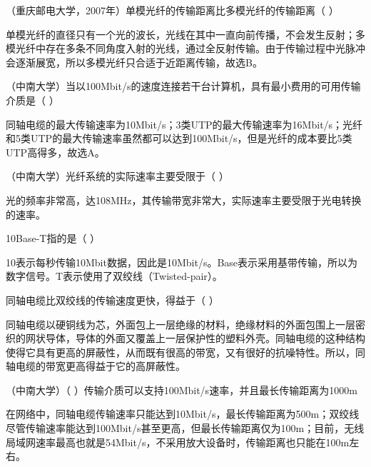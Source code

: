 \question （重庆邮电大学，2007年）单模光纤的传输距离比多模光纤的传输距离（ ）
\par{}
\begin{solution}单模光纤的直径只有一个光的波长，光线在其中一直向前传播，不会发生反射；多模光纤中存在多条不同角度入射的光线，通过全反射传输。由于传输过程中光脉冲会逐渐展宽，所以多模光纤只合适于近距离传输，故选B。
\end{solution}
\question （中南大学）当以100Mbit/s的速度连接若干台计算机，具有最小费用的可用传输介质是（
）
\par{}
\begin{solution}同轴电缆的最大传输速率为10Mbit/s；3类UTP的最大传输速率为16Mbit/s；光纤和5类UTP的最大传输速率虽然都可以达到100Mbit/s，但是光纤的成本要比5类UTP高得多，故选A。
\end{solution}
\question （中南大学）光纤系统的实际速率主要受限于（ ）
\par{}
\begin{solution}光的频率非常高，达108MHz，其传输带宽非常大，实际速率主要受限于光电转换的速率。
\end{solution}
\question 10Base-T指的是（ ）
\par{}
\begin{solution}10表示每秒传输10Mbit数据，因此是10Mbit/s。Base表示采用基带传输，所以为数字信号。T表示使用了双绞线（Twisted-pair）。
\end{solution}
\question 同轴电缆比双绞线的传输速度更快，得益于（ ）
\par{}
\begin{solution}同轴电缆以硬铜线为芯，外面包上一层绝缘的材料，绝缘材料的外面包围上一层密织的网状导体，导体的外面又覆盖上一层保护性的塑料外壳。同轴电缆的这种结构使得它具有更高的屏蔽性，从而既有很高的带宽，又有很好的抗噪特性。所以，同轴电缆的带宽更高得益于它的高屏蔽性。
\end{solution}
\question （中南大学）（ ）传输介质可以支持100Mbit/s速率，并且最长传输距离为1000m
\par{}
\begin{solution}在网络中，同轴电缆传输速率只能达到10Mbit/s，最长传输距离为500m；双绞线尽管传输速率能达到100Mbit/s甚至更高，但最长传输距离仅为100m；目前，无线局域网速率最高也就是54Mbit/s，不采用放大设备时，传输距离也只能在100m左右。
\end{solution}
